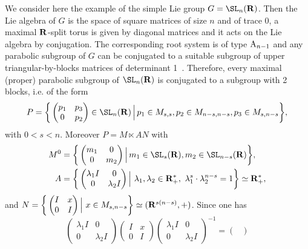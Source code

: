 \begin{exam}\label{ex_SL}
We consider here the example of the simple Lie group $G = \SL_n({\bf R})$. Then the Lie algebra of $G$ is the space of square matrices of size $n$ and of trace 0, a maximal ${\bf R}$-split torus is given by diagonal matrices and it acts on the Lie algebra by conjugation. The corresponding root system is of type ${\rm A}_{n-1}$ and any parabolic subgroup of $G$ can be conjugated to a suitable subgroup of upper triangular-by-blocks matrices of determinant 1~\cite[11.14]{Borel-Arith}. Therefore, every maximal (proper) parabolic subgroup of $\SL_n({\bf R})$ is conjugated to a subgroup with 2 blocks, i.e. of the form
\[
P = \bigg\{
\begin{pmatrix}
p_1 & p_3 \\
0 & p_2
\end{pmatrix}
\in \SL_n({\bf R})\,\Big\vert\,p_1 \in M_{s,s}, p_2 \in M_{n-s,n-s}, p_3 \in M_{s,n-s}\bigg\},
\]
with $0<s<n$. Moreover $P = M \ltimes AN$ with
\begin{align*}
M^0 &= \bigg\{
\begin{pmatrix}
m_1 & 0 \\
0 & m_2
\end{pmatrix}
\Big\vert\,m_1 \in \SL_s({\bf R}), m_2 \in \SL_{n-s}({\bf R})\bigg\},
\\
A &= \bigg\{
\begin{pmatrix}
\lambda_1 I & 0 \\
0 & \lambda_2 I
\end{pmatrix}
\Big\vert~\lambda_1,\lambda_2 \in {\bf R} ^* _+,~\lambda_1 ^s \cdot \lambda_2 ^{n-s} =1 \bigg\} \simeq {\bf R} ^* _+,
\end{align*}
and $N =\bigg\{
\begin{pmatrix}
I & x \\
0 & I
\end{pmatrix}
\Big\vert~x \in M_{s, n-s} \bigg\} \simeq ({\bf R} ^{s(n-s)}, +)$. Since one has
\[
\begin{pmatrix}
\lambda_1 I & 0 \\
0 & \lambda_2 I
\end{pmatrix}
\!
\begin{pmatrix}
I & x \\
0 & I
\end{pmatrix}
\!
\begin{pmatrix}
\lambda_1 I & 0 \\
0 & \lambda_2 I
\end{pmatrix} ^{-1} =
\begin{pmatrix}

\end{pmatrix}\]
\end{exam}
